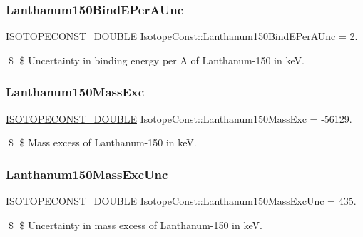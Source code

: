 \subsubsection{\texorpdfstring{Lanthanum150\+Bind\+E\+Per\+A\+Unc}{Lanthanum150BindEPerAUnc}}
{\footnotesize\ttfamily \mbox{\hyperlink{group___isotope_const-_macros_ga8f45a7272ce02c0b4c65c44636ed719a}{I\+S\+O\+T\+O\+P\+E\+C\+O\+N\+S\+T\+\_\+\+D\+O\+U\+B\+LE}} Isotope\+Const\+::\+Lanthanum150\+Bind\+E\+Per\+A\+Unc = 2.}

\$ \$ Uncertainty in binding energy per A of Lanthanum-\/150 in keV. \mbox{\label{group___isotope_const-_lanthanum-_la150_ga23e1f0e95adf49b75eb8c8af9a91f25a}} 
\subsubsection{\texorpdfstring{Lanthanum150\+Mass\+Exc}{Lanthanum150MassExc}}
{\footnotesize\ttfamily \mbox{\hyperlink{group___isotope_const-_macros_ga8f45a7272ce02c0b4c65c44636ed719a}{I\+S\+O\+T\+O\+P\+E\+C\+O\+N\+S\+T\+\_\+\+D\+O\+U\+B\+LE}} Isotope\+Const\+::\+Lanthanum150\+Mass\+Exc = -\/56129.}

\$ \$ Mass excess of Lanthanum-\/150 in keV. \mbox{\label{group___isotope_const-_lanthanum-_la150_ga143f279293d9c74cb0bef1e03c3e51b2}} 
\subsubsection{\texorpdfstring{Lanthanum150\+Mass\+Exc\+Unc}{Lanthanum150MassExcUnc}}
{\footnotesize\ttfamily \mbox{\hyperlink{group___isotope_const-_macros_ga8f45a7272ce02c0b4c65c44636ed719a}{I\+S\+O\+T\+O\+P\+E\+C\+O\+N\+S\+T\+\_\+\+D\+O\+U\+B\+LE}} Isotope\+Const\+::\+Lanthanum150\+Mass\+Exc\+Unc = 435.}

\$ \$ Uncertainty in mass excess of Lanthanum-\/150 in keV. \mbox{\label{group___isotope_const-_lanthanum-_la150_ga99d5a08bd36117218829269acc61c592}} 
